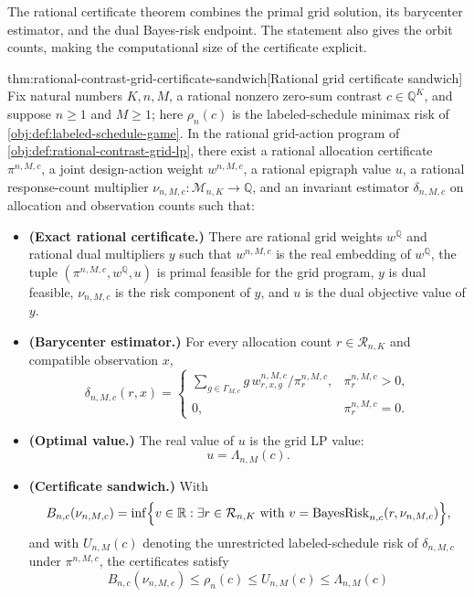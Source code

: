 The rational certificate theorem combines the primal grid solution, its barycenter estimator, and the dual Bayes-risk endpoint. The statement also gives the orbit counts, making the computational size of the certificate explicit.

\begin{theoremv}{thm:rational-contrast-grid-certificate-sandwich}[Rational grid certificate sandwich]
Fix natural numbers \(K,n,M\), a rational nonzero zero-sum contrast \(c\in\mathbb Q^K\), and suppose \(n\geq 1\) and \(M\geq 1\); here \(\rho_n(c)\) is the labeled-schedule minimax risk of \cref{obj:def:labeled-schedule-game}.  In the rational grid-action program of \cref{obj:def:rational-contrast-grid-lp}, there exist a rational allocation certificate \(\pi^{n,M,c}\), a joint design-action weight \(w^{n,M,c}\), a rational epigraph value \(u\), a rational response-count multiplier \(\nu_{n,M,c}:\mathcal M_{n,K}\to\mathbb Q\), and an invariant estimator \(\delta_{n,M,c}\) on allocation and observation counts such that:
\begin{itemize}
\item \textbf{(Exact rational certificate.)}  There are rational grid weights \(w^{\mathbb Q}\) and rational dual multipliers \(y\) such that \(w^{n,M,c}\) is the real embedding of \(w^{\mathbb Q}\), the tuple \((\pi^{n,M,c},w^{\mathbb Q},u)\) is primal feasible for the grid program, \(y\) is dual feasible, \(\nu_{n,M,c}\) is the risk component of \(y\), and \(u\) is the dual objective value of \(y\).
\item \textbf{(Barycenter estimator.)}  For every allocation count \(r\in\mathcal R_{n,K}\) and compatible observation \(x\),
\[
\delta_{n,M,c}(r,x)
=
\begin{cases}
\displaystyle
\sum_{g\in\Gamma_{M,c}} g\,w_{r,x,g}^{n,M,c}/\pi_r^{n,M,c},
& \pi_r^{n,M,c}>0,\\[0.7em]
0,& \pi_r^{n,M,c}=0.
\end{cases}
\]
\item \textbf{(Optimal value.)}  The real value of \(u\) is the grid LP value:
\[
u=\Lambda_{n,M}(c).
\]
\item \textbf{(Certificate sandwich.)}  With
\[
B_{n,c}(\nu_{n,M,c})
=
\inf\Bigl\{v\in\mathbb R:\exists r\in\mathcal R_{n,K}\ \text{with}\ 
v=\operatorname{BayesRisk}_{n,c}(r,\nu_{n,M,c})\Bigr\},
\]
and with \(U_{n,M}(c)\) denoting the unrestricted labeled-schedule risk of \(\delta_{n,M,c}\) under \(\pi^{n,M,c}\), the certificates satisfy
\[
B_{n,c}(\nu_{n,M,c})
\leq
\rho_n(c)
\leq
U_{n,M}(c)
\leq
\Lambda_{n,M}(c)
\]
\end{itemize}
\end{theoremv}
